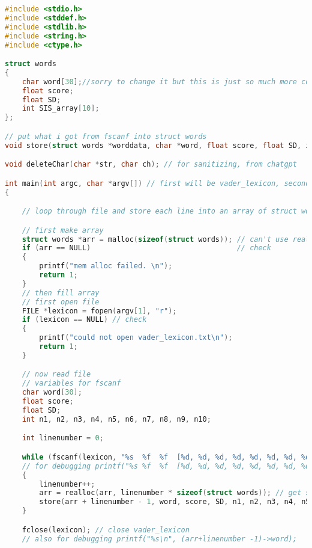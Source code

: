 \documentclass{article}
\begin{document}
\begin{lstlisting}[language=C, caption=main.c]
#include <stdio.h>
#include <stddef.h>
#include <stdlib.h>
#include <string.h>
#include <ctype.h>

struct words
{
    char word[30];//sorry to change it but this is just so much more convenient and i dont think there's a word longer than 30 letters so i think it's fine
    float score;
    float SD;
    int SIS_array[10];
};

// put what i got from fscanf into struct words
void store(struct words *worddata, char *word, float score, float SD, int n1, int n2, int n3, int n4, int n5, int n6, int n7, int n8, int n9, int n10);

void deleteChar(char *str, char ch); // for sanitizing, from chatgpt

int main(int argc, char *argv[]) // first will be vader_lexicon, second will be validation
{

    // loop through file and store each line into an array of struct words

    // first make array
    struct words *arr = malloc(sizeof(struct words)); // can't use realloc before using malloc so here
    if (arr == NULL)                                  // check
    {
        printf("mem alloc failed. \n");
        return 1;
    }
    // then fill array
    // first open file
    FILE *lexicon = fopen(argv[1], "r");
    if (lexicon == NULL) // check
    {
        printf("could not open vader_lexicon.txt\n");
        return 1;
    }

    // now read file
    // variables for fscanf
    char word[30];
    float score;
    float SD;
    int n1, n2, n3, n4, n5, n6, n7, n8, n9, n10;

    int linenumber = 0;

    while (fscanf(lexicon, "%s	%f	%f	[%d, %d, %d, %d, %d, %d, %d, %d, %d, %d]\n", word, &score, &SD, &n1, &n2, &n3, &n4, &n5, &n6, &n7, &n8, &n9, &n10) != -1) // the emojis/phrases with spaces screw me up so i'll just ignore them ahaha...
    // for debugging printf("%s	%f	%f	[%d, %d, %d, %d, %d, %d, %d, %d, %d, %d]\n", word, score, SD, n1, n2, n3, n4, n5, n6, n7, n8, n9, n10);
    {
        linenumber++;
        arr = realloc(arr, linenumber * sizeof(struct words)); // get space each time so it's flexy to sizey of filey
        store(arr + linenumber - 1, word, score, SD, n1, n2, n3, n4, n5, n6, n7, n8, n9, n10);
    }

    fclose(lexicon); // close vader_lexicon
    // also for debugging printf("%s\n", (arr+linenumber -1)->word);


\end{lstlisting}
\end{document}
